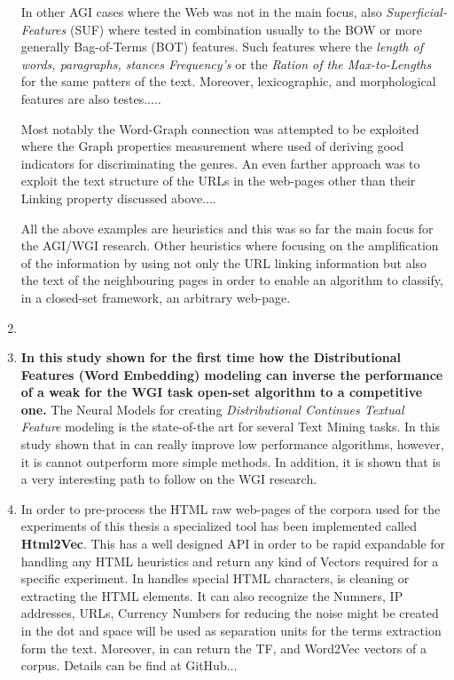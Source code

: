 \begin{enumerate}
In other AGI cases where the Web was not in the main focus, also \textit{Superficial-Features} (SUF) where tested in combination usually to the BOW or more generally Bag-of-Terms (BOT) features. Such features where the \textit{length of words, paragraphs, stances Frequency's} or the \textit{Ration of the Max-to-Lengths} for the same patters of the text. Moreover, lexicographic, and morphological features are also testes.....

Most notably the Word-Graph connection was attempted to be exploited where the Graph properties measurement where used of  deriving good indicators for discriminating the genres. An even farther approach was to exploit the text structure of the URLs in the web-pages other than their Linking property discussed above....

All the above examples are heuristics and this was so far the main focus for the AGI/WGI research. Other heuristics where focusing on the amplification of the information by using not only the URL linking information but also the text of the neighbouring pages in order to enable an algorithm to classify, in a closed-set framework, an arbitrary web-page. 
\item 
\item \textbf{In this study shown for the first time how the Distributional Features (Word Embedding) modeling can inverse the performance of a weak for the WGI task open-set algorithm to a competitive one.} The Neural Models for creating \textit{Distributional Continues Textual Feature} modeling is the state-of-the art for several Text Mining tasks. In this study shown that in can really improve low performance algorithms, however, it is cannot outperform more simple methods. In addition, it is shown that is a very interesting path to follow on the WGI research. 
\item In order to pre-process the HTML raw web-pages of the corpora used for the experiments of this thesis a specialized tool has been implemented called \textbf{Html2Vec}. This has a well designed API in order to be rapid expandable for handling any HTML heuristics and return any kind of Vectors required for a specific experiment. In handles special HTML characters, is cleaning or extracting the HTML elements. It can also recognize the Numners, IP addresses, URLs, Currency Numbers for reducing the noise might be created in the dot and space will be used as separation units for the terms extraction form the text. Moreover, in can return the TF, and Word2Vec vectors of a corpus. Details can be find at GitHub...

\end{enumerate}

